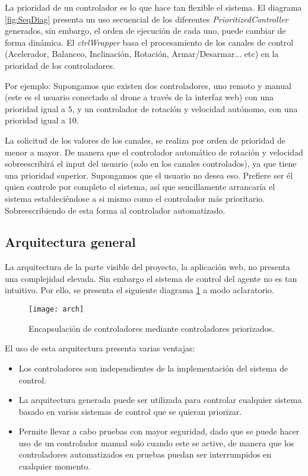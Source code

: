 La prioridad de un controlador es lo que hace tan flexible el sistema. El diagrama \ref{fig:SeqDiag} presenta un uso secuencial de los diferentes \emph{PrioritizedController} generados, sin embargo, el orden de ejecución de cada uno, puede cambiar de forma dinámica. 
El \emph{ctrlWrapper} basa el procesamiento de los canales de control (Acelerador, Balanceo, Inclinación, Rotación, Armar/Desarmar... etc) en la prioridad de los controladores. 

Por ejemplo: Supongamos que existen dos controladores, uno remoto y manual (este es el usuario conectado al drone a través de la interfaz web) con una prioridad igual a $5$, y un controlador de rotación y velocidad autónomo, con una prioridad igual a $10$. 

La solicitud de los valores de los canales, se realiza por orden de prioridad de menor a mayor. De manera que el controlador automático de rotación y velocidad sobreescribirá el input del usuario (solo en los canales controlados), ya que tiene una prioridad superior. 
Supongamos que el usuario no desea eso. Prefiere ser él quien controle por completo el sistema, así que sencillamente arrancaría el sistema estableciéndose a si mismo como el controlador más prioritario. Sobreescribiendo de esta forma al controlador automatizado. 


\subsection{Arquitectura general}

La arquitectura de la parte visible del proyecto, la aplicación web, no presenta una complejidad elevada. Sin embargo el sistema de control del agente no es tan intuitivo. Por ello, se presenta el siguiente diagrama \ref{fig:arch} a modo aclaratorio.


\begin{figure}[H]
	\centering
	\texttt{[image: arch]}
	\caption[Arquitectura del sistema de control de agentes]{Encapsulación de controladores mediante controladores priorizados.}\label{fig:arch}
\end{figure}

El uso de esta arquitectura presenta varias ventajas: 
\begin{itemize}
\item Los controladores son independientes de la implementación del sistema de control. 
\item La arquitectura generada puede ser utilizada para controlar cualquier sistema basado en varios sistemas de control que se quieran priorizar. 
\item Permite llevar a cabo pruebas con mayor seguridad, dado que se puede hacer uso de un controlador manual solo cuando este se active, de manera que los controladores automatizados en pruebas puedan ser interrumpidos en cualquier momento. 
\end{itemize}


